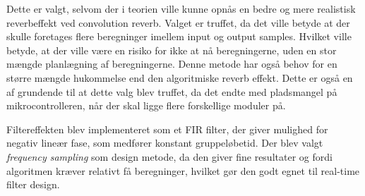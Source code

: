 Dette er valgt, selvom der i teorien ville kunne opnås en bedre og mere realistisk reverbeffekt ved convolution reverb.
Valget er truffet, da det ville betyde at der skulle foretages flere beregninger imellem input og output samples.
Hvilket ville betyde, at der ville være en risiko for ikke at nå beregningerne, uden en stor mængde planlægning af beregningerne.
Denne metode har også behov for en større mængde hukommelse end den algoritmiske reverb effekt.
Dette er også en af grundende til at dette valg blev truffet, da det endte med pladsmangel på mikrocontrolleren, når der skal ligge flere forskellige moduler på.

Filtereffekten blev implementeret som et FIR filter, der giver mulighed for negativ lineær fase, som medfører konstant gruppeløbetid.
Der blev valgt \textit{frequency sampling} som design metode, da den giver fine resultater og fordi algoritmen kræver relativt få beregninger, hvilket gør den godt egnet til real-time filter design.


